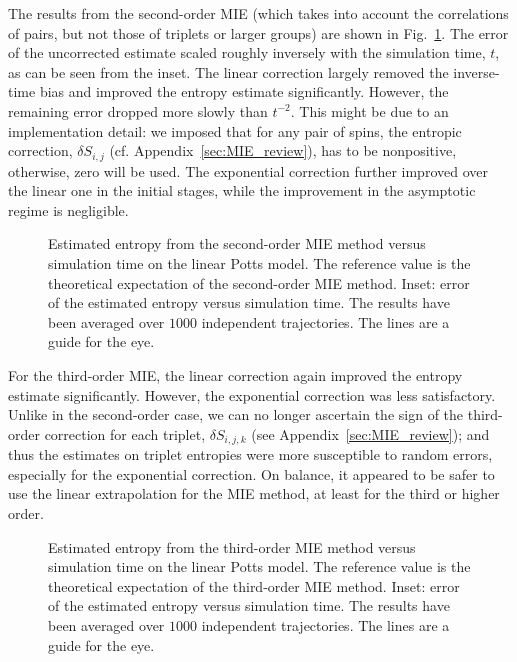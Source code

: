 \documentclass[reprint, superscriptaddress]{revtex4-1}
\begin{document}
The results from the second-order MIE
(which takes into account the correlations of pairs,
but not those of triplets or larger groups)
are shown in Fig.~\ref{fig:potts_mie2nd}.
%
The error of the uncorrected estimate
scaled roughly inversely with the simulation time, $t$,
as can be seen from the inset.
%
The linear correction largely removed the inverse-time bias
and improved the entropy estimate significantly.
%
However, the remaining error dropped more slowly than $t^{-2}$.
%
This might be due to an implementation detail:
we imposed that for any pair of spins,
the entropic correction,
$\delta S_{i, j}$ (cf. Appendix~\ref{sec:MIE_review}),
has to be nonpositive,
otherwise, zero will be used.
%
The exponential correction further improved over
the linear one in the initial stages,
while the improvement in the asymptotic regime is negligible.
%

\begin{figure}[h]\centering
  \caption{
    \label{fig:potts_mie2nd}
    Estimated entropy from the second-order MIE method
    versus simulation time on the linear Potts model.
    The reference value is the theoretical expectation
    of the second-order MIE method.
    Inset: error of the estimated entropy
    versus simulation time.
    The results have been averaged over $1000$ independent trajectories.
    The lines are a guide for the eye.
  }
\end{figure}


For the third-order MIE,
the linear correction again improved the entropy estimate
significantly.
However, the exponential correction was less satisfactory.
%
Unlike in the second-order case,
we can no longer ascertain the sign of
the third-order correction for each triplet,
$\delta S_{i, j, k}$ (see Appendix~\ref{sec:MIE_review});
and thus the estimates on triplet entropies
were more susceptible to random errors,
especially for the exponential correction.
%
On balance, it appeared to be safer
to use the linear extrapolation for the MIE method,
at least for the third or higher order.

\begin{figure}[h]\centering
  \caption{
    \label{fig:potts_mie3rd}
    Estimated entropy from the third-order MIE method
    versus simulation time on the linear Potts model.
    The reference value is the theoretical expectation
    of the third-order MIE method.
    Inset: error of the estimated entropy
    versus simulation time.
    The results have been averaged over $1000$ independent trajectories.
    The lines are a guide for the eye.
  }
\end{figure}
\end{document}
